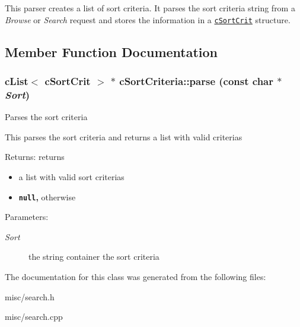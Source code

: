 This parser creates a list of sort criteria. It parses the sort criteria string from a {\em Browse\/} or {\em Search\/} request and stores the information in a {\tt \hyperlink{structcSortCrit}{cSortCrit}} structure. 

\subsection{Member Function Documentation}
\hypertarget{classcSortCriteria_818579ec634d8b6f670a55545970b9e7}{
\subsubsection[{parse}]{\setlength{\rightskip}{0pt plus 5cm}cList$<$ {\bf cSortCrit} $>$ $\ast$ cSortCriteria::parse (const char $\ast$ {\em Sort})}}
\label{classcSortCriteria_818579ec634d8b6f670a55545970b9e7}


Parses the sort criteria

This parses the sort criteria and returns a list with valid criterias

\begin{Desc}
\item[Returns:]returns\begin{itemize}
\item a list with valid sort criterias\item {\bf {\tt null},} otherwise \end{itemize}
\end{Desc}
\begin{Desc}
\item[Parameters:]
\begin{description}
\item[{\em Sort}]the string container the sort criteria \end{description}
\end{Desc}


The documentation for this class was generated from the following files:\begin{CompactItemize}
\item 
misc/search.h\item 
misc/search.cpp\end{CompactItemize}
